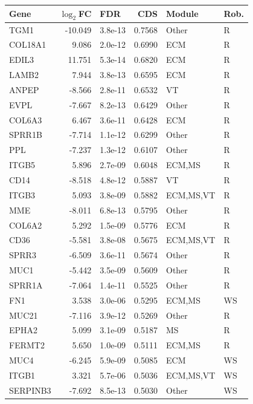 \begin{table}[ht]
\centering
\begin{tabular}{lrlrll}
  \hline
Gene & $\log_2$FC & FDR & CDS & Module & Rob. \\ 
  \hline
TGM1 & -10.049 & 3.8e-13 & 0.7568 & Other & R \\ 
  COL18A1 & 9.086 & 2.0e-12 & 0.6990 & ECM & R \\ 
  EDIL3 & 11.751 & 5.3e-14 & 0.6820 & ECM & R \\ 
  LAMB2 & 7.944 & 3.8e-13 & 0.6595 & ECM & R \\ 
  ANPEP & -8.566 & 2.8e-11 & 0.6532 & VT & R \\ 
  EVPL & -7.667 & 8.2e-13 & 0.6429 & Other & R \\ 
  COL6A3 & 6.467 & 3.6e-11 & 0.6428 & ECM & R \\ 
  SPRR1B & -7.714 & 1.1e-12 & 0.6299 & Other & R \\ 
  PPL & -7.237 & 1.3e-12 & 0.6107 & Other & R \\ 
  ITGB5 & 5.896 & 2.7e-09 & 0.6048 & ECM,MS & R \\ 
  CD14 & -8.518 & 4.8e-12 & 0.5887 & VT & R \\ 
  ITGB3 & 5.093 & 3.8e-09 & 0.5882 & ECM,MS,VT & R \\ 
  MME & -8.011 & 6.8e-13 & 0.5795 & Other & R \\ 
  COL6A2 & 5.292 & 1.5e-09 & 0.5776 & ECM & R \\ 
  CD36 & -5.581 & 3.8e-08 & 0.5675 & ECM,MS,VT & R \\ 
  SPRR3 & -6.509 & 3.6e-11 & 0.5674 & Other & R \\ 
  MUC1 & -5.442 & 3.5e-09 & 0.5609 & Other & R \\ 
  SPRR1A & -7.064 & 1.4e-11 & 0.5525 & Other & R \\ 
  FN1 & 3.538 & 3.0e-06 & 0.5295 & ECM,MS & WS \\ 
  MUC21 & -7.116 & 3.9e-12 & 0.5269 & Other & R \\ 
  EPHA2 & 5.099 & 3.1e-09 & 0.5187 & MS & R \\ 
  FERMT2 & 5.650 & 1.0e-09 & 0.5111 & ECM,MS & R \\ 
  MUC4 & -6.245 & 5.9e-09 & 0.5085 & ECM & WS \\ 
  ITGB1 & 3.321 & 5.7e-06 & 0.5036 & ECM,MS,VT & WS \\ 
  SERPINB3 & -7.692 & 8.5e-13 & 0.5030 & Other & WS \\ 

\end{tabular}
\end{table}
